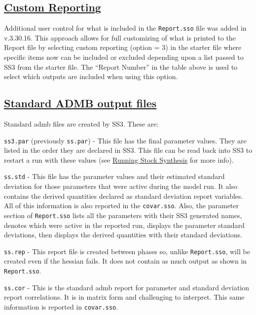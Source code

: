 \subsection[Custom Reporting]{\protect\hyperlink{CustomReporting}{Custom Reporting}}
\hypertarget{custom}{} 
Additional user control for what is included in the \texttt{Report.sso} file was added in v.3.30.16. This approach allows for full customizing of what is printed to the Report file by selecting custom reporting (option = 3) in the starter file where specific items now can be included or excluded depending upon a list passed to SS3 from the starter file. The ``Report Number'' in the table above is used to select which outputs are included when using this option.

\hypertarget{ADMBOutput}{}
\subsection[Standard ADMB output files]{\protect\hyperlink{ADMBOutput}{Standard ADMB output files}}
Standard \gls{admb} files are created by SS3. These are:

\texttt{ss3.par} (previously \texttt{ss.par}) - This file has the final parameter values. They are listed in the order they are declared in SS3. This file can be read back into SS3 to restart a run with these values (see \hyperref[sec:RunningSS3]{Running Stock Synthesis} for more info).

\texttt{ss.std} - This file has the parameter values and their estimated standard deviation for those parameters that were active during the model run. It also contains the derived quantities declared as standard deviation report variables. All of this information is also reported in the \texttt{covar.sso}. Also, the parameter section of \texttt{Report.sso} lists all the parameters with their SS3 generated names, denotes which were active in the reported run, displays the parameter standard deviations, then displays the derived quantities with their standard deviations.

\texttt{ss.rep} - This report file is created between phases so, unlike \texttt{Report.sso}, will be created even if the hessian fails. It does not contain as much output as shown in \texttt{Report.sso}.

\texttt{ss.cor} - This is the standard \gls{admb} report for parameter and standard deviation report correlations. It is in matrix form and challenging to interpret. This same information is reported in \texttt{covar.sso}.

